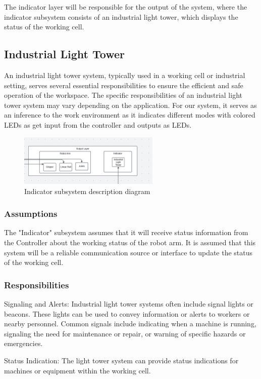 The indicator layer will be responsible for the output of the system, where the indicator subsystem consists of an industrial light tower, which displays the status of the working cell.   

\subsection{Industrial Light Tower}
An industrial light tower system, typically used in a working cell or industrial setting, serves several essential responsibilities to ensure the efficient and safe operation of the workspace. The specific responsibilities of an industrial light tower system may vary depending on the application. For our system, it serves as an inference to the work environment as it indicates different modes with colored LEDs as get input from the controller and outputs as LEDs. 
\begin{figure}[h!]
	\centering
 	\includegraphics[width=0.60\textwidth]{images/indicator.png}
 \caption{Indicator subsystem description diagram}
\end{figure}

\subsubsection{Assumptions}
The "Indicator" subsystem assumes that it will receive status information from the Controller about the working status of the robot arm. It is assumed that this system will be a reliable communication source or interface to update the status of the working cell. 
\subsubsection{Responsibilities}
Signaling and Alerts: Industrial light tower systems often include signal lights or beacons. These lights can be used to convey information or alerts to workers or nearby personnel. Common signals include indicating when a machine is running, signaling the need for maintenance or repair, or warning of specific hazards or emergencies.

Status Indication: The light tower system can provide status indications for machines or equipment within the working cell. 

